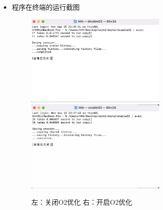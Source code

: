 \begin{itemize}
\begin{figure}[htbp]
                \end{figure}
                \newpage
                \item 程序在终端的运行截图
                \begin{figure}[htbp]
                    \centering
                    \includegraphics*[width = 7cm]{work2_s3.png}
                    \includegraphics*[width = 7cm]{work2_s4.png}
                    \caption{左：关闭O2优化 右：开启O2优化}
                \end{figure}
            \end{itemize}
         
